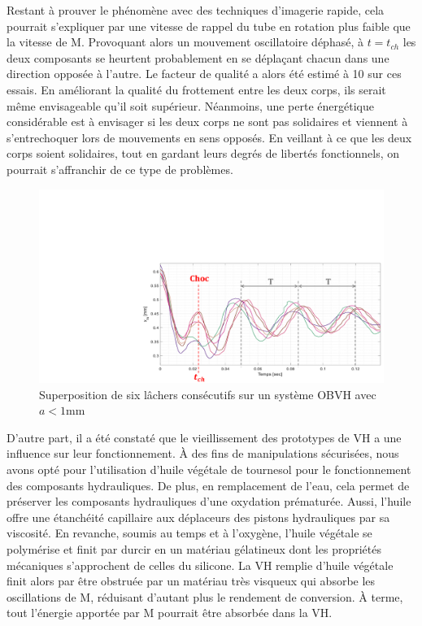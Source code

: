 Restant à prouver le phénomène avec des techniques d'imagerie rapide, cela pourrait s'expliquer par une vitesse de rappel du tube en rotation plus faible que la vitesse de M. Provoquant alors un mouvement oscillatoire déphasé, à $t=t_{ch}$ les deux composants se heurtent probablement en se déplaçant chacun dans une direction opposée à l'autre. Le facteur de qualité a alors été estimé à 10 sur ces essais. En améliorant la qualité du frottement entre les deux corps, ils serait même envisageable qu'il soit supérieur. Néanmoins, une perte énergétique considérable est à envisager si les deux corps ne sont pas solidaires et viennent à s'entrechoquer lors de mouvements en sens opposés. En veillant à ce que les deux corps soient solidaires, tout en gardant leurs degrés de libertés fonctionnels, on pourrait s'affranchir de ce type de problèmes.
\begin{figure}[!htbp]
\begin{center}
		\captionsetup{justification=centering} 
		\includegraphics[trim={10cm 0cm 0cm 7cm},clip,width=\textwidth]{../Chap6/Figure/lachers_avec_tube_CHOC.pdf}
		\caption{Superposition de six lâchers consécutifs sur un système OBVH avec $a<1$mm}
		\label{fig:lachers_avec_tube_CHOC}
\end{center}	
\end{figure}    

D'autre part, il a été constaté que le vieillissement des prototypes de VH a une influence sur leur fonctionnement. À des fins de manipulations sécurisées, nous avons opté pour l'utilisation d'huile végétale de tournesol pour le fonctionnement des composants hydrauliques. De plus, en remplacement de l'eau, cela permet de préserver les composants hydrauliques d'une oxydation prématurée. Aussi, l'huile offre une étanchéité capillaire aux déplaceurs des pistons hydrauliques par sa viscosité. En revanche, soumis au temps et à l'oxygène, l'huile végétale se polymérise et finit par durcir en un matériau gélatineux dont les propriétés mécaniques s'approchent de celles du silicone. La VH remplie d'huile végétale finit alors par être obstruée par un matériau très visqueux qui absorbe les oscillations de M, réduisant d'autant plus le rendement de conversion. À terme, tout l'énergie apportée par M pourrait être absorbée dans la VH. 

